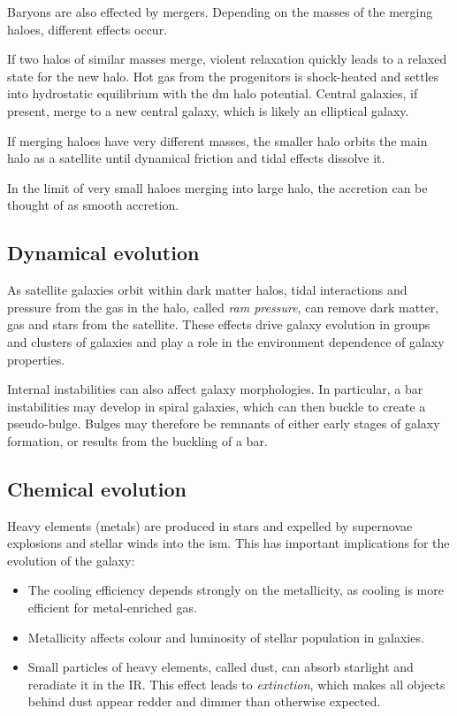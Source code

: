 Baryons are also effected by mergers. Depending on the masses of the merging haloes, different effects occur.

If two halos of similar masses merge, violent relaxation quickly leads to a relaxed state for the new halo.
Hot gas from the progenitors is shock-heated and settles into hydrostatic equilibrium with the \ac{dm} halo potential.
Central galaxies, if present, merge to a new central galaxy, which is likely an elliptical galaxy.

If merging haloes have very different masses, the smaller halo orbits the main halo as a satellite until dynamical friction and tidal effects dissolve it.

In the limit of very small haloes merging into large halo, the accretion can be thought of as smooth accretion.


\subsection{Dynamical evolution}

As satellite galaxies orbit within dark matter halos, tidal interactions and pressure from the gas in the halo, called \emph{ram pressure}, can remove dark matter, gas and stars from the satellite.
These effects drive galaxy evolution in groups and clusters of galaxies and play a role in the environment dependence of galaxy properties.

Internal instabilities can also affect galaxy morphologies. 
In particular, a bar instabilities may develop in spiral galaxies, which can then buckle to create a pseudo-bulge. 
Bulges may therefore be remnants of either early stages of galaxy formation, or results from the buckling of a bar.

\subsection{Chemical evolution}

Heavy elements (metals) are produced in stars and expelled by supernovae explosions and stellar winds into the \ac{ism}. This has important implications for the evolution of the galaxy:

\begin{itemize}
	\item The cooling efficiency depends strongly on the metallicity, as cooling is more efficient for metal-enriched gas.
	\item Metallicity affects colour and luminosity of stellar population in galaxies.
	\item Small particles of heavy elements, called dust, can absorb starlight and reradiate it in the IR.
	This effect leads to \emph{extinction}, which makes all objects behind dust appear redder and dimmer than otherwise expected.
\end{itemize}


